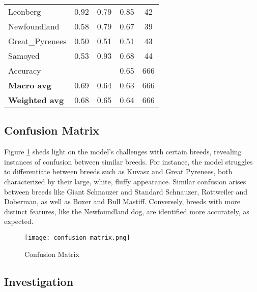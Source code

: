 \documentclass[11pt]{article}
\begin{document}
\begin{table}[htbp]
\begin{tabular}{lcccc}
Leonberg                     & 0.92               & 0.79            & 0.85               & 42               \\
Newfoundland                 & 0.58               & 0.79            & 0.67               & 39               \\
Great\_Pyrenees              & 0.50               & 0.51            & 0.51               & 43               \\
Samoyed                      & 0.53               & 0.93            & 0.68               & 44               \\ \hline
Accuracy                      &                    &                 & 0.65               & 666              \\
\textbf{Macro avg}            & 0.69               & 0.64            & 0.63               & 666              \\
\textbf{Weighted avg}         & 0.68               & 0.65            & 0.64               & 666              \\ \hline
\end{tabular}
\end{table}

\subsection{Confusion Matrix}

Figure \ref{fig:cm} sheds light on the model's challenges with certain breeds, revealing instances of confusion between similar breeds. For instance, the model struggles to differentiate between breeds such as Kuvasz and Great Pyrenees, both characterized by their large, white, fluffy appearance. Similar confusion arises between breeds like Giant Schnauzer and Standard Schnauzer, Rottweiler and Doberman, as well as Boxer and Bull Mastiff. Conversely, breeds with more distinct features, like the Newfoundland dog, are identified more accurately, as expected.

\begin{figure}[h]
    \centering
    \texttt{[image: confusion\_matrix.png]}
    \caption{\label{fig:cm}Confusion Matrix}
\end{figure}

\newpage

\subsection{Investigation}
\end{document}
